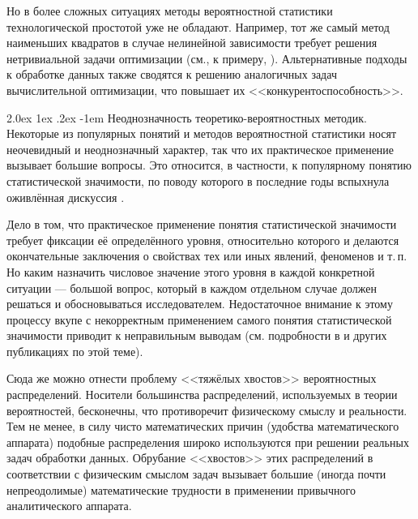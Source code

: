 \documentclass[a5paper,openany]{book}
\makeatletter
\renewcommand\paragraph{\@startsection{paragraph}{4}{\z@}%
                         {2.0ex \@plus1ex \@minus.2ex}%
                         {-1em}%
                         {\normalfont\normalsize\bfseries}}
\makeatother
\begin{document}
Но в более сложных ситуациях методы вероятностной статистики технологической 
простотой уже не обладают. Например, тот же самый метод наименьших квадратов 
в случае нелинейной зависимости требует решения нетривиальной задачи оптимизации 
(см., к примеру, \cite{DemidenkoBook}). Альтернативные подходы к обработке данных 
также сводятся к решению аналогичных задач вычислительной оптимизации, что повышает 
их <<конкурентоспособность>>. 
   
  
\paragraph{Неоднозначность теоретико-вероятностных методик.}  Некоторые из популярных 
понятий и методов вероятностной статистики носят неочевидный и неоднозначный характер, 
так что их практическое применение вызывает большие вопросы. Это относится, в частности, 
к популярному понятию статистической значимости, по поводу которого в последние годы 
вспыхнула оживлённая дискуссия \cite{Amrhein2019, Wasserstein}.  
  
Дело в том, что практическое применение понятия статистической значимости требует 
фиксации её определённого уровня, относительно которого и делаются окончательные 
заключения о свойствах тех или иных явлений, феноменов и т.\,п. Но каким назначить 
числовое значение этого уровня в каждой конкретной ситуации --- большой вопрос, который 
в каждом отдельном случае должен решаться и обосновываться исследователем. Недостаточное 
внимание к этому процессу вкупе с некорректным применением самого понятия статистической 
значимости  приводит к неправильным выводам (см. подробности в \cite{Amrhein2019, 
Wasserstein} и других публикациях по этой теме). 
  
Сюда же можно отнести проблему <<тяжёлых хвостов>> вероятностных распределений.  
Носители большинства распределений, используемых в теории вероятностей, бесконечны, 
что противоречит физическому смыслу и реальности. Тем не менее, в силу чисто 
математических причин (удобства математического аппарата) подобные распределения 
широко используются при решении реальных задач обработки данных. Обрубание <<хвостов>> 
этих распределений в соответствии с физическим смыслом задач вызывает большие (иногда 
почти непреодолимые) математические трудности в применении привычного аналитического 
аппарата. 
  
\end{document}
